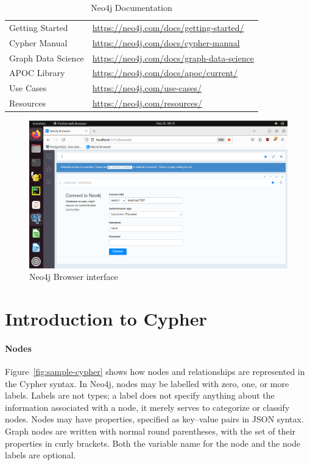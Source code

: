 \begin{table}
\renewcommand{\arraystretch}{1.5}
\centering
\small
\begin{tabular}{l|l} \hline
Getting Started & \url{https://neo4j.com/docs/getting-started/} \\ 
Cypher Manual & \url{https://neo4j.com/docs/cypher-manual} \\
Graph Data Science & \url{https://neo4j.com/docs/graph-data-science} \\ 
APOC Library & \url{https://neo4j.com/docs/apoc/current/} \\ 
Use Cases & \url{https://neo4j.com/use-cases/} \\
Resources & \url{https://neo4j.com/resources/} \\
\hline
\end{tabular}
\caption{Neo4j Documentation}
\label{tab:neo4jinfo}
\end{table}

\begin{figure}
\centering
\includegraphics[width=.75\textwidth]{screen1.png}
\caption{Neo4j Browser interface}
\label{fig:neo4jbrowser}
\end{figure}

\section{Introduction to Cypher}

\paragraph*{Nodes}
Figure~\ref{fig:sample-cypher} shows how nodes and relationships are represented in the Cypher syntax. In Neo4j, nodes may be labelled with zero, one, or more labels. Labels are not types; a label does not specify anything about the information associated with a node, it merely serves to categorize or classify nodes. Nodes may have properties, specified as key--value pairs in JSON syntax. Graph nodes are written with normal round parentheses, with the set of their properties in curly brackets. Both the variable name for the node and the node labels are optional.

